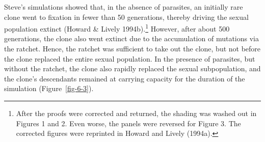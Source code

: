 \documentclass[
  letterpaper,
]{book}
\begin{document}
Steve's simulations showed that, in the absence of parasites, an
initially rare clone went to fixation in fewer than 50 generations,
thereby driving the sexual population extinct (Howard \& Lively
1994b).\footnote{After the proofs were corrected and returned, the
  shading was washed out in Figures 1 and 2. Even worse, the panels were
  reversed for Figure 3. The corrected figures were reprinted in Howard
  and Lively (1994a).} However, after about 500 generations, the clone
also went extinct due to the accumulation of mutations via the ratchet.
Hence, the ratchet was sufficient to take out the clone, but not before
the clone replaced the entire sexual population. In the presence of
parasites, but without the ratchet, the clone also rapidly replaced the
sexual subpopulation, and the clone's descendants remained at carrying
capacity for the duration of the simulation (Figure~\ref{fig-6-3}).
\end{document}
